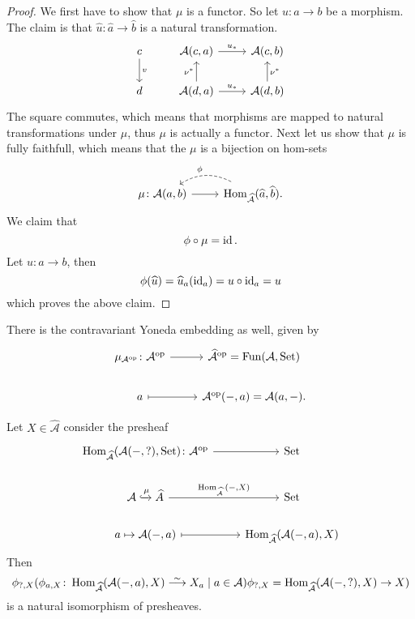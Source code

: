 \begin{proof}
    We first have to show that $\mu$ is a functor. 
    So let $u\colon a \to  b$ be a morphism.
    The claim is that $\widehat{u}\colon \widehat{a} \to \widehat{b}$ is a natural transformation.
    \[
    \begin{tikzcd}
        c
        \arrow[d,"v"]
        &
        \mathcal{A}(c,a)
        \arrow[r,"u_*"]
        &
        \mathcal{A}(c,b)
        \\
        d
        &
        \mathcal{A}(d,a)
        \arrow[u,"\nu^*"]
        \arrow[r,"u_*"]
        &
        \mathcal{A}(d,b)
        \arrow[u,"\nu^*"']
    \end{tikzcd}
    \]
    The square commutes, which means that morphisms are mapped to natural transformations under $\mu$, thus $\mu$ is actually a functor.
    Next let us show that $\mu$ is fully faithfull, which means that the $\mu$ is a bijection on hom-sets
    \[
    \begin{tikzcd}
        \mu \colon \mathcal{A}(a,b) 
        \arrow[r]
        &
        \Hom_\mathcal{\widehat{A}}(\widehat{a}, \widehat{b}).
        \arrow[l, bend right, dashed, "\phi"']
    \end{tikzcd}
    \]
    We claim that
    \[
    \phi \circ \mu = \operatorname{id}.
    \]
    Let $u\colon a \to b$, then
    \[
    \phi(\widehat{u}) = \widehat{u}_a(\operatorname{id}_a) = u \circ \operatorname{id}_a = u
    \]
    which proves the above claim.
\end{proof}

\begin{rmk}
    There is the contravariant Yoneda embedding as well, given by
    \[
    \begin{tikzcd}
        \mu_{\mathcal{A}^{\op}} \colon \mathcal{A}^{\op}
        \arrow[r]
        &
        \widehat{\mathcal{A}}^{\op} = \Fun(\mathcal{A}, \Set)
        \\
        a 
        \arrow[r, mapsto]
        &
        \mathcal{A}^{\op}(-,a)= \mathcal{A}(a,-).
    \end{tikzcd}
    \]
\end{rmk}

\begin{prop}
    Let $X \in \widehat{\mathcal{A}} $ consider the presheaf
    \[
    \begin{tikzcd}
        \Hom_{\widehat{\mathcal{A}}}(\mathcal{A}(-,?) , \Set ) \colon \mathcal{A}^{\op} 
        \arrow[r]
        &
        \Set
        \\
        \mathcal{A}
        \xhookrightarrow{\mu}
        \widehat{A}
        \arrow[r, "\Hom_{\widehat{\mathcal{A}}}{( -, X )}"]
        &
        \Set
        \\
        a \mapsto \mathcal{A}(-,a)
        \arrow[r, mapsto]
        &
        \Hom_{\widehat{\mathcal{A}}}(\mathcal{A}(-,a),X)
    \end{tikzcd}
    \]
    Then 
    \[
    \phi_{?,X}(\phi_{a,X}\colon\Hom_{\widehat{\mathcal{A}}}(\mathcal{A}(-,a),X) \isomorphism X_a \mid a \in \mathcal{A})
    \\
    \phi_{?,X}= \Hom_{\widehat{\mathcal{A}}}(\mathcal{A}(-,?),X) \to X)
    \]
    is a natural isomorphism of presheaves.
\end{prop}

